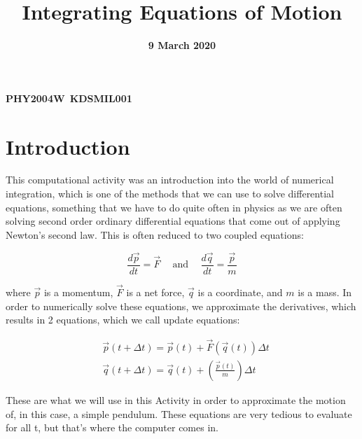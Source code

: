 \documentclass[12pt]{article}
\title{Integrating Equations of Motion}
\date{\textbf{9 March 2020}}
\author{}
\begin{document}
    \begin{titlepage}
        \maketitle
        \center
        \textbf{\large{PHY2004W}}\
        \textbf{\large{KDSMIL001}}\
        \tableofcontents
    \end{titlepage}

    \section{Introduction}
    This computational activity was an introduction into the world of numerical integration, 
    which is one of the methods that we can use to solve differential equations, something 
    that we have to do quite often in physics as we are often solving second order ordinary 
    differential equations that come out of applying Newton's second law. This is often 
    reduced to two coupled equations:

    \begin{equation}
        \frac{d\vec{p}}{dt} = \vec{F}
        \hspace{15pt}
        \textrm{and}
        \hspace{15pt}
        \frac{d\vec{q}}{dt} = \frac{\vec{p}}{m}
        \label{eq:newton}
    \end{equation}

    \noindent
    where $\vec{p}$ is a momentum, $\vec{F}$ is a net force, $\vec{q}$ is a coordinate, 
    and $m$ is a mass. 
    \newline
    In order to numerically solve these equations, we approximate the derivatives, which 
    results in 2 equations, which we call update equations:

    \begin{equation}
        \begin{split}
            &\vec{p}(t+\Delta t) = \vec{p}(t)+\vec{F}(\vec{q}(t))\Delta t \\
            &\vec{q}(t+\Delta t) = \vec{q}(t)+\left(\frac{\vec{p}(t)}{m}\right)\Delta t 
        \end{split}
        \label{eq:update}
    \end{equation}

    \noindent
    These are what we will use in this Activity in order to approximate the motion of, in 
    this case, a simple pendulum. These equations are very tedious to evaluate for all t, 
    but that's where the computer comes in. 
\end{document}
